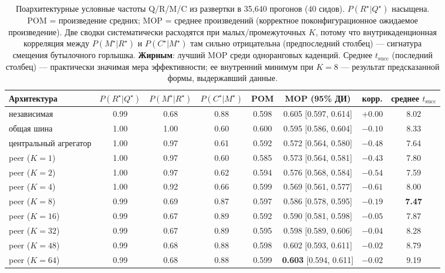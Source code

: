 \documentclass{article}
\begin{document}
\begin{table}[h]
\caption{Поархитектурные условные частоты Q/R/M/C из развертки в 35{,}640 прогонов (40 сидов). $P(R^\star|Q^\star)$ насыщена. POM = произведение средних; MOP = среднее произведений (корректное поконфигурационное ожидаемое произведение). Две сводки систематически расходятся при малых/промежуточных $K$, потому что внутрикаденционная корреляция между $P(M^\star|R^\star)$ и $P(C^\star|M^\star)$ там сильно отрицательна (предпоследний столбец) --- сигнатура смещения бутылочного горлышка. \textbf{Жирным}: лучший MOP среди одноранговых каденций. Среднее $t_{\mathrm{succ}}$ (последний столбец) --- практически значимая мера эффективности; ее внутренний минимум при $K=8$ --- результат предсказанной формы, выдержавший данные.}
\label{tab:multi-agent-cond}
\centering
\scriptsize
\setlength{\tabcolsep}{3.5pt}
\begin{tabular}{l c c c c c c c}
\toprule
Архитектура & $P(R^\star|Q^\star)$ & $P(M^\star|R^\star)$ & $P(C^\star|M^\star)$ & POM & MOP (95\% ДИ) & корр. & среднее $t_{\mathrm{succ}}$ \\
\midrule
независимая          & 0.99 & 0.68 & 0.88 & 0.598 & 0.605 [0.597, 0.614] & $+0.00$ & 8.02 \\
общая шина           & 1.00 & 1.00 & 0.60 & 0.600 & 0.595 [0.586, 0.604] & $-0.10$ & 8.33 \\
центральный агрегатор & 1.00 & 0.97 & 0.61 & 0.592 & 0.572 [0.564, 0.580] & $-0.48$ & 7.64 \\
peer ($K=1$)         & 1.00 & 0.97 & 0.60 & 0.585 & 0.573 [0.564, 0.581] & $-0.43$ & 7.80 \\
peer ($K=2$)         & 1.00 & 0.97 & 0.62 & 0.594 & 0.576 [0.568, 0.584] & $-0.54$ & 7.59 \\
peer ($K=4$)         & 1.00 & 0.92 & 0.66 & 0.599 & 0.569 [0.561, 0.577] & $-0.61$ & 8.00 \\
peer ($K=8$)         & 0.99 & 0.69 & 0.87 & 0.597 & 0.586 [0.578, 0.595] & $-0.19$ & \textbf{7.47} \\
peer ($K=16$)        & 0.99 & 0.67 & 0.89 & 0.592 & 0.590 [0.581, 0.598] & $-0.05$ & 7.87 \\
peer ($K=32$)        & 0.99 & 0.67 & 0.89 & 0.595 & 0.598 [0.589, 0.606] & $-0.04$ & 8.28 \\
peer ($K=48$)        & 0.99 & 0.68 & 0.88 & 0.598 & 0.602 [0.593, 0.611] & $-0.02$ & 8.79 \\
peer ($K=64$)        & 0.99 & 0.68 & 0.88 & 0.599 & \textbf{0.603} [0.594, 0.611] & $-0.02$ & 9.19 \\
\bottomrule
\end{tabular}
\end{table}
\end{document}

